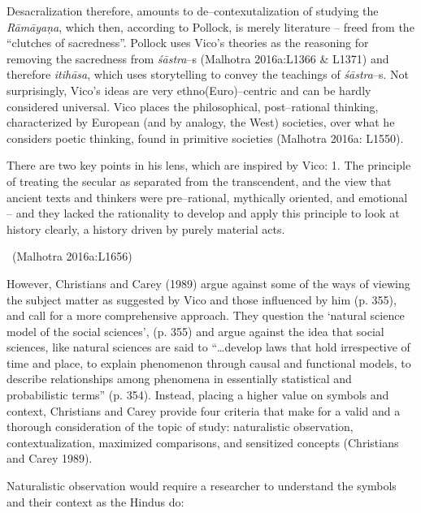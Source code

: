 Desacralization therefore, amounts to de–contexutalization of studying the \textit{Rāmāyaṇa}, which then, according to Pollock, is merely literature – freed from the “clutches of sacredness”. Pollock uses Vico’s theories as the reasoning for removing the sacredness from \textit{śāstra}–s (Malhotra 2016a:L1366 \& L1371) and therefore \textit{itihāsa}, which uses storytelling to convey the teachings of \textit{śāstra}–s. Not surprisingly, Vico’s ideas are very ethno(Euro)–centric and can be hardly considered universal. Vico places the philosophical, post–rational thinking, characterized by European (and by analogy, the West) societies, over what he considers poetic thinking, found in primitive societies (Malhotra 2016a: L1550).

\begin{myquote}
There are two key points in his lens, which are inspired by Vico: 1. The principle of treating the secular as separated from the transcendent, and the view that ancient texts and thinkers were pre–rational, mythically oriented, and emotional – and they lacked the rationality to develop and apply this principle to look at history clearly, a history driven by purely material acts. 

~\hfill (Malhotra 2016a:L1656)
\end{myquote}

However, Christians and Carey (1989) argue against some of the ways of viewing the subject matter as suggested by Vico and those influenced by him (p. 355), and call for a more comprehensive approach. They question the ‘natural science model of the social sciences’, (p. 355) and argue against the idea that social sciences, like natural sciences are said to “…develop laws that hold irrespective of time and place, to explain phenomenon through causal and functional models, to describe relationships among phenomena in essentially statistical and probabilistic terms” (p. 354). Instead, placing a higher value on symbols and context, Christians and Carey provide four criteria that make for a valid and a thorough consideration of the topic of study: naturalistic observation, contextualization, maximized comparisons, and sensitized concepts (Christians and Carey 1989).

Naturalistic observation would require a researcher to understand the symbols and their context as the Hindus do:

